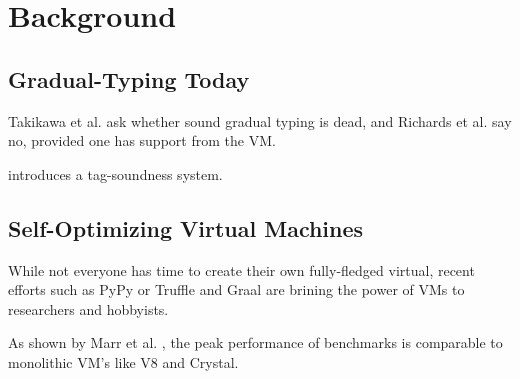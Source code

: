 \section{Background}
\label{sec:background}

\subsection{Gradual-Typing Today}

Takikawa et al. \cite{Takikawa2016} ask whether sound gradual typing is dead, and Richards et al. \cite{Richards2017} say no, provided one has support from the VM.

\cite{Greenman2017} introduces a tag-soundness system.

\subsection{Self-Optimizing Virtual Machines}

While not everyone has time to create their own fully-fledged virtual, recent efforts such as PyPy  or Truffle and Graal \cite{Wurthinger2013} are brining the power of VMs to researchers and hobbyists.

As shown by Marr et al. \cite{Marr2016}, the peak performance of benchmarks is comparable to monolithic VM's like V8 and Crystal. 